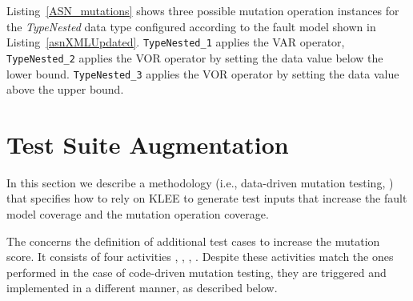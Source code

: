 




Listing~\ref{ASN_mutations} shows three possible mutation operation instances for the \emph{TypeNested} data type configured according to the fault model shown in Listing~\ref{asnXMLUpdated}.
\texttt{TypeNested\_1} applies the VAR operator,
 \texttt{TypeNested\_2} applies the VOR operator by setting the data value below the lower bound.
 \texttt{TypeNested\_3} applies the VOR operator by setting the data value above the upper bound.



\clearpage



\clearpage
\section{Test Suite Augmentation} %
\label{sec:data:test_suite_augmentation}



In this section we describe a methodology (i.e., data-driven mutation testing, ) that specifies how to rely on KLEE to generate test inputs that increase the fault model coverage and the mutation operation coverage.

The  concerns the definition of additional test cases to increase the mutation score.
It consists of four activities , , , . 
Despite these activities match the ones performed in the case of code-driven mutation testing, they are triggered and implemented in a different manner, as described below.

